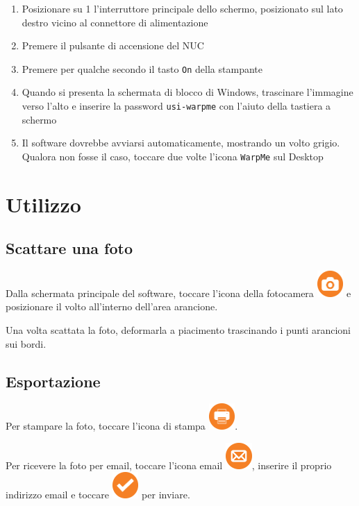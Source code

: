 \documentclass[12pt]{article}
\begin{document}
	\begin{enumerate}		
		\item Posizionare su 1 l'interruttore principale dello schermo, posizionato sul lato destro vicino al connettore di alimentazione
		\item Premere il pulsante di accensione del NUC
		\item Premere per qualche secondo il tasto \texttt{On} della stampante
		\item Quando si presenta la schermata di blocco di Windows, trascinare l'immagine verso l'alto e inserire la password \texttt{usi-warpme} con l'aiuto della tastiera a schermo
		\item Il software dovrebbe avviarsi automaticamente, mostrando un volto grigio. Qualora non fosse il caso, toccare due volte l'icona \texttt{WarpMe} sul Desktop
	\end{enumerate}	
		
		
		
\section{Utilizzo}

	\subsection{Scattare una foto}

		Dalla schermata principale del software, toccare l'icona della fotocamera \includegraphics[width=1cm]{../src/resource/icons/camera.png} e posizionare il volto all'interno dell'area arancione.
		
		Una volta scattata la foto, deformarla a piacimento trascinando i punti arancioni sui bordi.        
	
	
	\subsection{Esportazione}
	
		Per stampare la foto, toccare l'icona di stampa \includegraphics[width=1cm]{../src/resource/icons/print.png}.
		
		Per ricevere la foto per email, toccare l'icona email \includegraphics[width=1cm]{../src/resource/icons/mail.png}, inserire il proprio indirizzo email e toccare \includegraphics[width=1cm]{../src/resource/icons/ok.png} per inviare.
		
\end{document}
